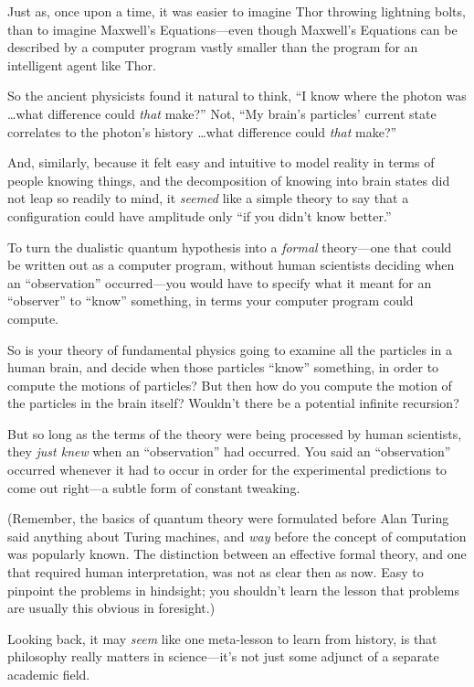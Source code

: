 {
 Just as, once upon a time, it was easier to imagine Thor throwing
lightning bolts, than to imagine Maxwell's
Equations---even though Maxwell's Equations can be
described by a computer program vastly smaller than the program for an
intelligent agent like Thor.}

{
 So the ancient physicists found it natural to think,
``I know where the photon was \ldots what difference
could \textit{that} make?'' Not,
``My brain's
particles' current state correlates to the
photon's history \ldots what difference could
\textit{that} make?''}

{
 And, similarly, because it felt easy and intuitive to model
reality in terms of people knowing things, and the decomposition of
knowing into brain states did not leap so readily to mind, it
\textit{seemed} like a simple theory to say that a configuration could
have amplitude only ``if you didn't
know better.''}

{
 To turn the dualistic quantum hypothesis into a \textit{formal}
theory---one that could be written out as a computer program, without
human scientists deciding when an
``observation'' occurred---you would
have to specify what it meant for an
``observer'' to
``know'' something, in terms your
computer program could compute.}

{
 So is your theory of fundamental physics going to examine all the
particles in a human brain, and decide when those particles
``know'' something, in order to
compute the motions of particles? But then how do you compute the
motion of the particles in the brain itself? Wouldn't
there be a potential infinite recursion?}

{
 But so long as the terms of the theory were being processed by
human scientists, they \textit{just knew} when an
``observation'' had occurred. You
said an ``observation'' occurred
whenever it had to occur in order for the experimental predictions to
come out right---a subtle form of constant tweaking.}

{
 (Remember, the basics of quantum theory were formulated before
Alan Turing said anything about Turing machines, and \textit{way}
before the concept of computation was popularly known. The distinction
between an effective formal theory, and one that required human
interpretation, was not as clear then as now. Easy to pinpoint the
problems in hindsight; you shouldn't learn the lesson
that problems are usually this obvious in foresight.)}

{
 Looking back, it may \textit{seem} like one meta-lesson to learn
from history, is that philosophy really matters in
science---it's not just some adjunct of a separate
academic field.}

